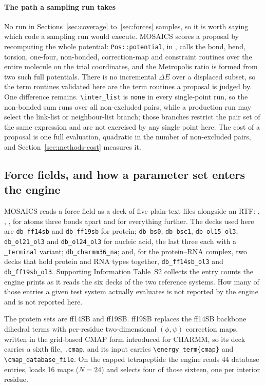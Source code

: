 \paragraph{The path a sampling run takes}
No run in Sections~\ref{sec:coverage} to~\ref{sec:forces} samples, so it is
worth saying which code a sampling run would execute. MOSAICS scores a proposal
by recomputing the whole potential: \texttt{Pos::potential}, in
, calls the bond, bend, torsion, one-four,
non-bonded, correction-map and constraint routines over the entire molecule on
the trial coordinates, and the Metropolis ratio is formed from two such full
potentials. There is no incremental $\Delta E$ over a displaced subset, so the
term routines validated here are the term routines a proposal is judged by. One
difference remains. \verb|\inter_list| is \verb|none| in every single-point
run, so the non-bonded sum runs over all non-excluded pairs, while a production
run may select the link-list or neighbour-list branch; those branches restrict
the pair set of the same expression and are not exercised by any single point
here. The cost of a proposal is one full evaluation, quadratic in the number of
non-excluded pairs, and Section~\ref{sec:methods-cost} measures it.

\subsection{Force fields, and how a parameter set enters the engine}
\label{sec:methods-parameters}

MOSAICS reads a force field as a deck of five plain-text files alongside an
RTF: , , ,  for atoms
three bonds apart and  for everything further. The decks
used here are \texttt{db\_ff14sb} and \texttt{db\_ff19sb} for protein;
\texttt{db\_bs0}, \texttt{db\_bsc1}, \texttt{db\_ol15\_ol3},
\texttt{db\_ol21\_ol3} and \texttt{db\_ol24\_ol3} for nucleic acid, the last
three each with a \texttt{\_terminal} variant; \texttt{db\_charmm36\_na}; and,
for the protein--RNA complex, two decks that hold protein and RNA types
together, \texttt{db\_ff14sb\_ol3} and \texttt{db\_ff19sb\_ol3}. Supporting
Information Table~S2 collects the entry counts the engine prints as it reads
the six decks of the two reference systems. How many of those entries a given
test system actually evaluates is not reported by the engine and is not
reported here.

The protein sets are ff14SB\cite{maier2015ff14sb} and
ff19SB\cite{tian2020ff19sb}. ff19SB replaces the ff14SB backbone dihedral terms
with per-residue two-dimensional $(\phi,\psi)$ correction maps, written in the
grid-based CMAP form introduced for
CHARMM\cite{mackerell2004cmap,mackerell2004cmapfull}, so its deck carries a
sixth file, \texttt{.cmap}, and its input carries \verb|\energy_term{cmap}| and
\verb|\cmap_database_file|. On the capped tetrapeptide the engine reads 44
database entries, loads 16 maps ($N=24$) and selects four of those sixteen, one
per interior residue.

